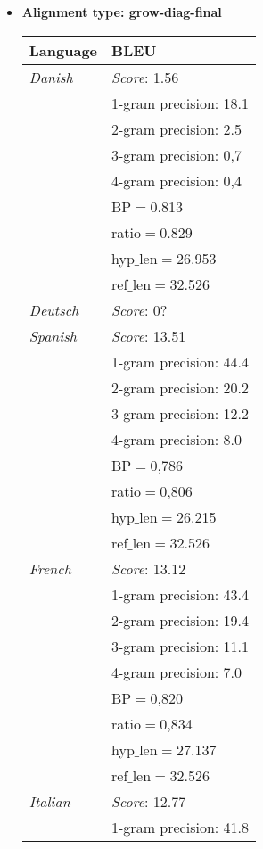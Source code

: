 \documentclass[11pt]{article}
\begin{document}
\begin{itemize}

\item \textbf{Alignment type: grow-diag-final}
\begin{center}
    \begin{tabular}{ | l | l |}
    \hline
    \textbf{Language} & \textbf{BLEU} \\ 
    \hline
    \textit{Danish} & \textit{Score}: 1.56 \\
    & 1-gram precision: 18.1 \\
    & 2-gram precision: 2.5 \\
    & 3-gram precision: 0,7 \\
    & 4-gram precision: 0,4 \\
    & BP$=$0.813 \\
    & ratio$=$0.829 \\
    & hyp$\_$len$=$26.953 \\
    & ref$\_$len$=$32.526\\
    \hline
    \textit{Deutsch} & \textit{Score}: 0? \\
    \hline
    \textit{Spanish} & \textit{Score}: 13.51 \\
    & 1-gram precision: 44.4 \\
    & 2-gram precision: 20.2 \\
    & 3-gram precision: 12.2 \\
    & 4-gram precision: 8.0 \\
    & BP$=$0,786 \\
    & ratio$=$0,806 \\
    & hyp$\_$len$=$26.215 \\
    & ref$\_$len$=$32.526\\
    \hline
    \textit{French} & \textit{Score}: 13.12 \\
    & 1-gram precision: 43.4 \\
    & 2-gram precision: 19.4 \\
    & 3-gram precision: 11.1 \\
    & 4-gram precision: 7.0 \\
    & BP$=$0,820 \\
    & ratio$=$0,834 \\
    & hyp$\_$len$=$27.137 \\
    & ref$\_$len$=$32.526\\
    \hline %
    \textit{Italian} & \textit{Score}: 12.77 \\
    & 1-gram precision: 41.8 \\

\end{tabular}
\end{center}
\end{itemize}
\end{document}
